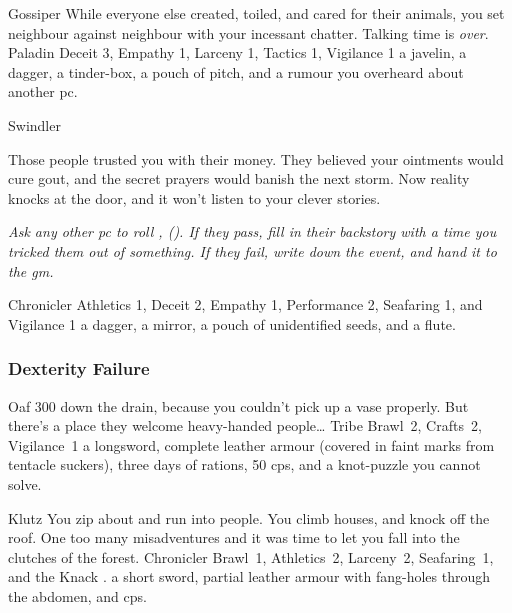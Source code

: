 \begin{multicols}{2}
\begin{itemize}
    {Gossiper}%
    {
      While everyone else created, toiled, and cared for their animals, you set neighbour against neighbour with your incessant chatter.
      Talking time is \emph{over}.
    }%
    {Paladin}%
    {Deceit 3, Empathy 1, Larceny 1, Tactics 1, Vigilance 1}%
    {a javelin, a dagger, a tinder-box, a pouch of pitch,%
      and a rumour you overheard about another \gls{pc}.}%

    {Swindler}%
    {
      Those people trusted you with their money.
      They believed your ointments would cure gout, and the secret prayers would banish the next storm.
      Now reality knocks at the door, and it won't listen to your clever stories.

      \textit{Ask any other \gls{pc} to roll , (\tn[8]).
      If they pass, fill in their backstory with a time you tricked them out of something.
      If they fail, write down the event, and hand it to the \gls{gm}.}
    }%
    {Chronicler}%
    {Athletics 1, Deceit 2, Empathy 1, Performance 2, Seafaring 1, and Vigilance 1}%
    {
      a dagger, a mirror, a pouch of unidentified seeds, and a flute.
    }%

\end{itemize}

\null


\subsubsection{Dexterity Failure}

\nobreak
\begin{itemize}

    {Oaf}%
    {300  down the drain, because you couldn't pick up a vase properly.
      But there's a place they welcome heavy-handed people\ldots
    }%
    {Tribe}%
    {Brawl~2, Crafts~2, Vigilance~1}%
    {a longsword, complete leather armour (covered in faint marks from tentacle suckers), three days of rations, 50 \glspl{cp}, and a knot-puzzle you cannot solve.}%

    {Klutz}%
    {You zip about and run into people.
      You climb houses, and knock off the roof.
      One too many misadventures and it was time to let you fall into the clutches of the forest.}%
    {Chronicler}%
    {Brawl~1, Athletics~2, Larceny~2, Seafaring~1, and the Knack \charge.}%
    {a short sword, partial leather armour with fang-holes through the abdomen, and  \glspl{cp}.}%


\end{itemize}
\end{multicols}
